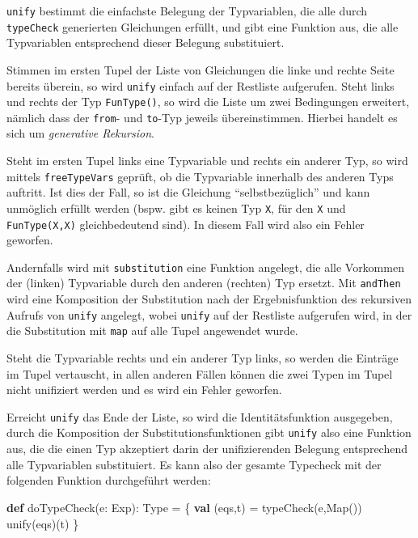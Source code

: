 \documentclass[]{article}
\newenvironment{Shaded}{}{}
\newcommand{\FunctionTok}[1]{\textcolor[rgb]{0.02,0.16,0.49}{#1}}
\newcommand{\KeywordTok}[1]{\textcolor[rgb]{0.00,0.44,0.13}{\textbf{#1}}}
\newcommand{\NormalTok}[1]{#1}
\begin{document}
\texttt{unify} bestimmt die einfachste Belegung der Typvariablen, die
alle durch \texttt{typeCheck} generierten Gleichungen erfüllt, und gibt
eine Funktion aus, die alle Typvariablen entsprechend dieser Belegung
substituiert.

Stimmen im ersten Tupel der Liste von Gleichungen die linke und rechte
Seite bereits überein, so wird \texttt{unify} einfach auf der Restliste
aufgerufen. Steht links und rechts der Typ \texttt{FunType()}, so wird
die Liste um zwei Bedingungen erweitert, nämlich dass der \texttt{from}-
und \texttt{to}-Typ jeweils übereinstimmen. Hierbei handelt es sich um
\emph{generative Rekursion}.

Steht im ersten Tupel links eine Typvariable und rechts ein anderer Typ,
so wird mittels \texttt{freeTypeVars} geprüft, ob die Typvariable
innerhalb des anderen Typs auftritt. Ist dies der Fall, so ist die
Gleichung ``selbstbezüglich'' und kann unmöglich erfüllt werden (bspw.
gibt es keinen Typ \texttt{X}, für den \texttt{X} und
\texttt{FunType(X,X)} gleichbedeutend sind). In diesem Fall wird also
ein Fehler geworfen.

Andernfalls wird mit \texttt{substitution} eine Funktion angelegt, die
alle Vorkommen der (linken) Typvariable durch den anderen (rechten) Typ
ersetzt. Mit \texttt{andThen} wird eine Komposition der Substitution
nach der Ergebnisfunktion des rekursiven Aufrufs von \texttt{unify}
angelegt, wobei \texttt{unify} auf der Restliste aufgerufen wird, in der
die Substitution mit \texttt{map} auf alle Tupel angewendet wurde.

Steht die Typvariable rechts und ein anderer Typ links, so werden die
Einträge im Tupel vertauscht, in allen anderen Fällen können die zwei
Typen im Tupel nicht unifiziert werden und es wird ein Fehler geworfen.

Erreicht \texttt{unify} das Ende der Liste, so wird die
Identitätsfunktion ausgegeben, durch die Komposition der
Substitutionsfunktionen gibt \texttt{unify} also eine Funktion aus, die
die einen Typ akzeptiert darin der unifizierenden Belegung entsprechend
alle Typvariablen substituiert. Es kann also der gesamte Typecheck mit
der folgenden Funktion durchgeführt werden:

\begin{Shaded}
\begin{Highlighting}[]
\KeywordTok{def} \FunctionTok{doTypeCheck}\NormalTok{(e: Exp): Type = \{}
  \KeywordTok{val}\NormalTok{ (eqs,t) = }\FunctionTok{typeCheck}\NormalTok{(e,Map())}
  \FunctionTok{unify}\NormalTok{(eqs)(t)}
\NormalTok{\}}
\end{Highlighting}
\end{Shaded}
\end{document}
